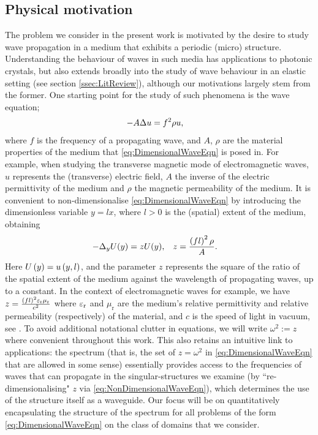 \subsection{Physical motivation} \label{ssec:PhysMot}
The problem we consider in the present work is motivated by the desire to study wave propagation in a medium that exhibits a periodic (micro) structure.
Understanding the behaviour of waves in such media has applications to photonic crystals, but also extends broadly into the study of wave behaviour in an elastic setting (see section \ref{ssec:LitReview}), although our motivations largely stem from the former.
One starting point for the study of such phenomena is the wave equation;
\begin{align} \label{eq:DimensionalWaveEqn}
	-A \Delta u &= f^2 \rho u,
\end{align}
where $f$ is the frequency of a propagating wave, and $A$, $\rho$ are the material properties of the medium that \eqref{eq:DimensionalWaveEqn} is posed in.
For example, when studying the transverse magnetic mode of electromagnetic waves, $u$ represents the (transverse) electric field, $A$ the inverse of the electric permittivity of the medium and $\rho$ the magnetic permeability of the medium.
It is convenient to non-dimensionalise \eqref{eq:DimensionalWaveEqn} by introducing the dimensionless variable $y=lx$, where $l>0$ is the (spatial) extent of the medium, obtaining
\begin{align} \label{eq:NonDimensionalWaveEqn}
	-\Delta_{y} U(y) = z U(y), &\quad z = \frac{\left( fl \right)^2 \rho }{A}.
\end{align}
Here $U\left( y \right) = u\left( y,l \right)$, and the parameter $z$ represents the square of the ratio of the spatial extent of the medium against the wavelength of propagating waves, up to a constant.
In the context of electromagnetic waves for example, we have $z = \frac{\left( fl \right)^2 \varepsilon_\mathrm{r}\mu_\mathrm{r}}{c^2}$ where $\varepsilon_\mathrm{r}$ and $\mu_\mathrm{r}$ are the medium's relative permittivity and relative permeability (respectively) of the material, and $c$ is the speed of light in vacuum, see \cite{jackson1999classical, cessenat1996mathematical}.
To avoid additional notational clutter in equations, we will write $\omega^2 := z$ where convenient throughout this work.
This also retains an intuitive link to applications: the spectrum (that is, the set of $z=\omega^2$ in \eqref{eq:DimensionalWaveEqn} that are allowed in some sense) essentially provides access to the frequencies of waves that can propagate in the singular-structures we examine (by ``re-dimensionalising" $z$ via \eqref{eq:NonDimensionalWaveEqn}), which determines the use of the structure itself as a waveguide.
Our focus will be on quantitatively encapsulating the structure of the spectrum for all problems of the form \eqref{eq:DimensionalWaveEqn} on the class of domains that we consider.

